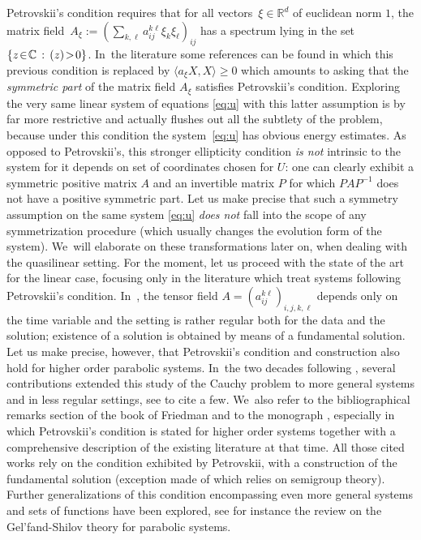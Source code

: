 \documentclass[10pt]{amsart}
\let\Re\relax
\DeclareMathOperator{\Re}{Re}
\theoremstyle{definition}
\newcommand\R{\mathbb{R}}
\begin{document}
Petrovskii's condition requires that for all vectors~$\xi\in\R^d$ of euclidean norm $1$, the matrix field~$A_\xi:= (\sum_{k,\ell} a_{ij}^{k\ell} \xi_k\xi_\ell)_{ij}$ has a spectrum lying in the set~\hbox{$\{z\!\in\!\mathbb{C}\,:\,\Re(z)\!>\!0\}$}. In~the literature some references can be found in which this previous condition is replaced by $\langle a_\xi X,X\rangle \geq 0$ which amounts to asking that the \emph{symmetric part} of the matrix field $A_\xi$ satisfies Petrovskii's condition. Exploring the very same linear system of equations \eqref{eq:u} with this latter assumption is by far more restrictive and actually flushes out all the subtlety of the problem, because under this condition the system~\eqref{eq:u} has obvious energy estimates. {As opposed to Petrovskii's, this stronger ellipticity condition \emph{is not} intrinsic to the system for it depends on set of coordinates chosen for $U$: one can clearly exhibit a symmetric positive matrix $A$ and an invertible matrix $P$ for which $PAP^{-1}$ does not have a positive symmetric part. Let us make precise that such a symmetry assumption on the same system \eqref{eq:u} \emph{does not} fall into the scope of any symmetrization procedure (which usually changes the evolution form of the system). We~will elaborate on these transformations later on, when dealing with the quasilinear setting.} For the moment, let us proceed with the state of the art for the linear case, focusing only in the literature which treat systems following Petrovskii's condition. In~\cite{petrorigine}, the tensor field $A=(a_{ij}^{k\ell})_{i,j,k,\ell}$ depends only on the time variable and the setting is rather regular both for the data and the solution; existence of a solution is obtained by means of a fundamental solution. Let us make precise, however, that Petrovskii's condition and construction also hold for higher order parabolic systems. In~the two decades following \cite{petrorigine}, several contributions extended this study of the Cauchy problem to more general systems and in less regular settings, see \cite{aronson,lady,eidelman} to cite a few. We~also refer to the bibliographical remarks section of the book \cite{friedman} of Friedman and to the monograph \cite{ladyfat}, {especially \cite[Chap.\,VII, \S8]{ladyfat} in which Petrovskii's condition is stated for higher order systems together with a comprehensive description of the existing literature at that time}. All those cited works rely on the condition exhibited by Petrovskii, with a construction of the fundamental solution (exception made of \cite{mizo} which relies on semigroup theory). Further generalizations of this condition encompassing even more general systems and sets of functions have been explored, see for instance the review \cite{pala} on the Gel'fand-Shilov theory for parabolic systems.
\end{document}
